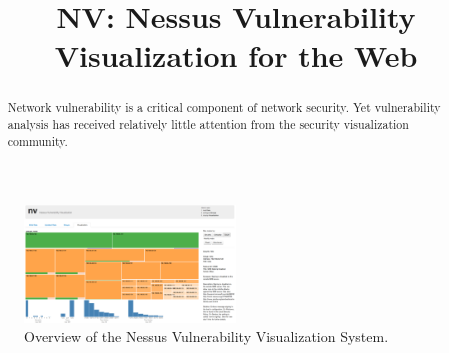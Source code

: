 \documentclass{acm_proc_article-sp}
\begin{document}
\title{NV: Nessus Vulnerability Visualization for the Web}


\author{
}

\maketitle
\begin{abstract}

Network vulnerability is a critical component of network security. 
Yet vulnerability analysis has received relatively little attention from the security visualization community.  

\end{abstract}




\begin{figure}
  \label{OverviewFig}
  \centering
  \includegraphics[width=0.5\textwidth]{../screenshots/overview}
  \caption{Overview of the Nessus Vulnerability Visualization System.}
\end{figure}
\end{document}
